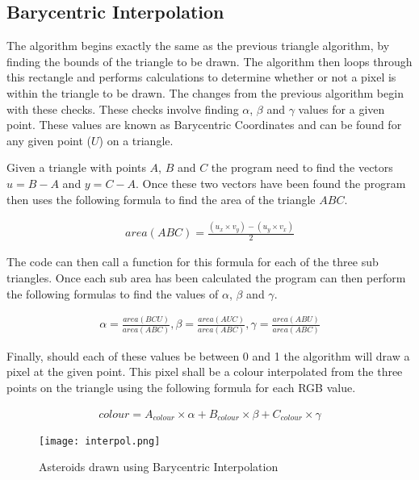 \documentclass[
	letterpaper, %
	10pt, %
]{CSUniSchoolLabReport}
\begin{document}
\subsection{Barycentric Interpolation}
\begin{flushleft}
	The algorithm begins exactly the same as the previous triangle algorithm, by 
	finding the bounds of the triangle to be drawn. The algorithm then loops through
	this rectangle and performs calculations to determine whether or not a pixel is within
	the triangle to be drawn. The changes from the previous algorithm begin with these checks.
	These checks involve finding \(\alpha\), \(\beta\) and \(\gamma\) values for a given point.
	These values are known as Barycentric Coordinates and can be found for any given point (\(U\))
	on a triangle.
\end{flushleft}
\begin{flushleft}
	Given a triangle with points \(A\), \(B\) and \(C\) the program need to find the vectors \(u = B-A\) and \(y = C-A\).
	Once these two vectors have been found the program then uses the following formula to find the area of the triangle \(ABC\).
\end{flushleft}
\begin{align*}
	area(ABC) = \frac{(u_{x} \times v_{y}) - (u_{y} \times v_{x})}{2}
\end{align*}
\begin{flushleft}
	The code can then call a function for this formula for each of the three sub triangles. Once each sub area has 
	been calculated the program can then perform the following formulas to find the values of \(\alpha\), \(\beta\) and \(\gamma\).
\end{flushleft}
\begin{align*}
	\alpha = \frac{area(BCU)}{area(ABC)}, \beta = \frac{area(AUC)}{area(ABC)}, \gamma = \frac{area(ABU)}{area(ABC)}
\end{align*}
\pagebreak
\begin{flushleft}
	Finally, should each of these values be between 0 and 1 the algorithm will draw a pixel at the given point.
	This pixel shall be a colour interpolated from the three points on the triangle using the following formula 
	for each RGB value.
\end{flushleft}
\begin{align*}
	colour = A_{colour} \times \alpha + B_{colour} \times \beta + C_{colour} \times \gamma
\end{align*}
\begin{figure}[H]
	\centering
	\texttt{[image: interpol.png]}
	\caption{Asteroids drawn using Barycentric Interpolation}
\end{figure}
\end{document}

